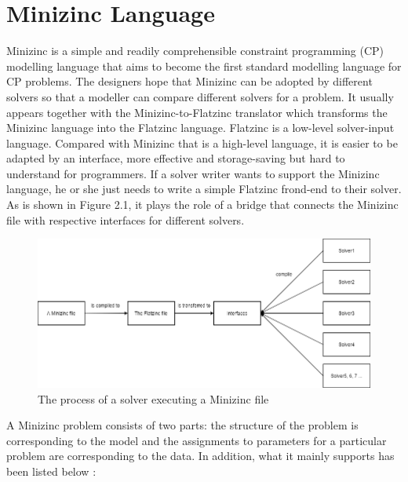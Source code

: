 \section{Minizinc Language}
Minizinc \cite{r10} is a simple and readily comprehensible constraint programming (CP) modelling language that aims to become the first standard modelling language for CP problems. The designers hope that Minizinc can be adopted by different solvers so that a modeller can compare different solvers for a problem. It usually appears together with the Minizinc-to-Flatzinc translator which transforms the Minizinc language into the Flatzinc language. Flatzinc \cite{r10} is a low-level solver-input language. Compared with Minizinc that is a high-level language, it is easier to be adapted by an interface, more effective and storage-saving but hard to understand for programmers. If a solver writer wants to support the Minizinc language, he or she just needs to write a simple Flatzinc frond-end to their solver. As is shown in Figure 2.1, it plays the role of a bridge that connects the Minizinc file with respective interfaces for different solvers. 
\begin{figure}[htbp]
\centering
\includegraphics[width=0.8\linewidth]{figs/flowofMinizinc.png}
\caption{The process of a solver executing a Minizinc file}
  \label{fig:process}
\end{figure}
A Minizinc problem consists of two parts: the structure of the problem is corresponding to the model and the assignments to parameters for a particular problem are corresponding to the data. In addition, what it mainly supports has been listed below \cite{r10}:\\
